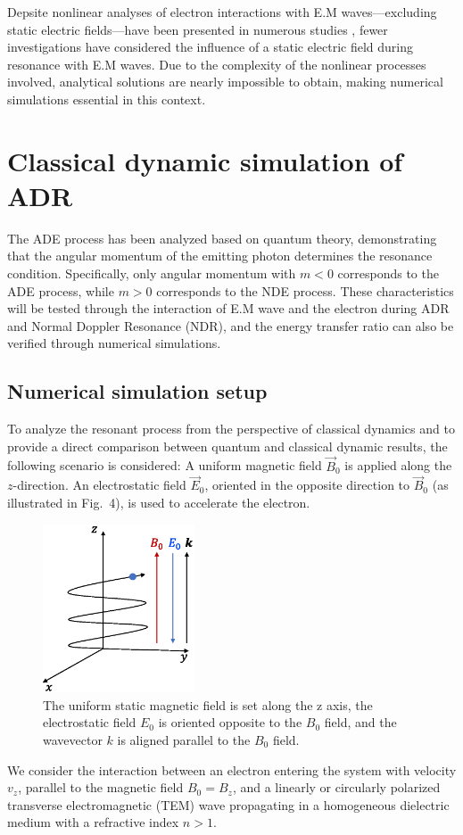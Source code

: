 \documentclass{cpbtex3}
\begin{document}
Depsite nonlinear analyses of electron interactions with E.M waves—excluding static electric fields—have been presented in numerous studies \cite{liu2004particle,qian1999exact,weyssow1990motion,gogoberidze2005origin,roberts1964motion,bourdier2000dynamics,nusinovich1999theory,nusinovich1995theory,qian2000relativistic}, fewer investigations have considered the influence of a static electric field during resonance with E.M waves. Due to the complexity of the nonlinear processes involved, analytical solutions are nearly impossible to obtain, making numerical simulations essential in this context.

\section{Classical dynamic simulation of ADR}\label{sec:level2}
The ADE process has been analyzed based on quantum theory, demonstrating that the angular momentum of the emitting photon determines the resonance condition. Specifically, only angular momentum with  $m < 0 $ corresponds to the ADE process, while $m >0 $ corresponds to the NDE process. These characteristics will be tested through the interaction of E.M wave and the electron during ADR and Normal Doppler Resonance (NDR), and the energy transfer ratio can also be verified through numerical simulations.
\subsection{Numerical simulation setup}
To analyze the resonant process from the perspective of classical dynamics and to provide a direct comparison between quantum and classical dynamic results, the following scenario is considered: A uniform magnetic field \( \vec{B}_0 \) is applied along the \( z \)-direction. An electrostatic field \( \vec{E}_0 \), oriented in the opposite direction to \( \vec{B}_0 \) (as illustrated in Fig.~4), is used to accelerate the electron. 
\begin{figure}
\centering
\includegraphics[width=0.4\textwidth]{Figure4.eps}%
\caption{\label{fig:Setup}The uniform static magnetic field is set along the z axis, the electrostatic field $E_0$ is oriented opposite to the $B_0$ field, and the wavevector $k$ is aligned parallel to the $B_0$ field.}
\end{figure}
We consider the interaction between an electron entering the system with velocity \( v_z \), parallel to the magnetic field \( B_0 = B_z \), and a linearly or circularly polarized transverse electromagnetic (TEM) wave propagating in a homogeneous dielectric medium with a refractive index \( n > 1 \).
\end{document}
